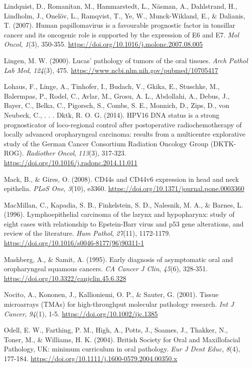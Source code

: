 Lindquist, D., Romanitan, M., Hammarstedt, L., Näsman, A., Dahlstrand, H., Lindholm, J., Onelöv, L., Ramqvist, T., Ye, W., Munck-Wikland, E., \& Dalianis, T. (2007). Human papillomavirus is a favourable prognostic factor in tonsillar cancer and its oncogenic role is supported by the expression of E6 and E7. \emph{Mol Oncol}, \emph{1}(3), 350-355. \url{https://doi.org/10.1016/j.molonc.2007.08.005}

Lingen, M. W. (2000). Lucas' pathology of tumors of the oral tissues. \emph{Arch Pathol Lab Med}, \emph{124}(3), 475. \url{https://www.ncbi.nlm.nih.gov/pubmed/10705417}

Lohaus, F., Linge, A., Tinhofer, I., Budach, V., Gkika, E., Stuschke, M., Balermpas, P., Rodel, C., Avlar, M., Grosu, A. L., Abdollahi, A., Debus, J., Bayer, C., Belka, C., Pigorsch, S., Combs, S. E., Monnich, D., Zips, D., von Neubeck, C., . . . Dktk, R. O. G. (2014). HPV16 DNA status is a strong prognosticator of loco-regional control after postoperative radiochemotherapy of locally advanced oropharyngeal carcinoma: results from a multicentre explorative study of the German Cancer Consortium Radiation Oncology Group (DKTK-ROG). \emph{Radiother Oncol}, \emph{113}(3), 317-323. \url{https://doi.org/10.1016/j.radonc.2014.11.011}

Mack, B., \& Gires, O. (2008). CD44s and CD44v6 expression in head and neck epithelia. \emph{PLoS One}, \emph{3}(10), e3360. \url{https://doi.org/10.1371/journal.pone.0003360}

MacMillan, C., Kapadia, S. B., Finkelstein, S. D., Nalesnik, M. A., \& Barnes, L. (1996). Lymphoepithelial carcinoma of the larynx and hypopharynx: study of eight cases with relationship to Epstein-Barr virus and p53 gene alterations, and review of the literature. \emph{Hum Pathol}, \emph{27}(11), 1172-1179. \url{https://doi.org/10.1016/s0046-8177(96)90311-1}

Mashberg, A., \& Samit, A. (1995). Early diagnosis of asymptomatic oral and oropharyngeal squamous cancers. \emph{CA Cancer J Clin}, \emph{45}(6), 328-351. \url{https://doi.org/10.3322/canjclin.45.6.328}

Nocito, A., Kononen, J., Kallioniemi, O. P., \& Sauter, G. (2001). Tissue microarrays (TMAs) for high-throughput molecular pathology research. \emph{Int J Cancer}, \emph{94}(1), 1-5. \url{https://doi.org/10.1002/ijc.1385}

Odell, E. W., Farthing, P. M., High, A., Potts, J., Soames, J., Thakker, N., Toner, M., \& Williams, H. K. (2004). British Society for Oral and Maxillofacial Pathology, UK: minimum curriculum in oral pathology. \emph{Eur J Dent Educ}, \emph{8}(4), 177-184. \url{https://doi.org/10.1111/j.1600-0579.2004.00350.x}

